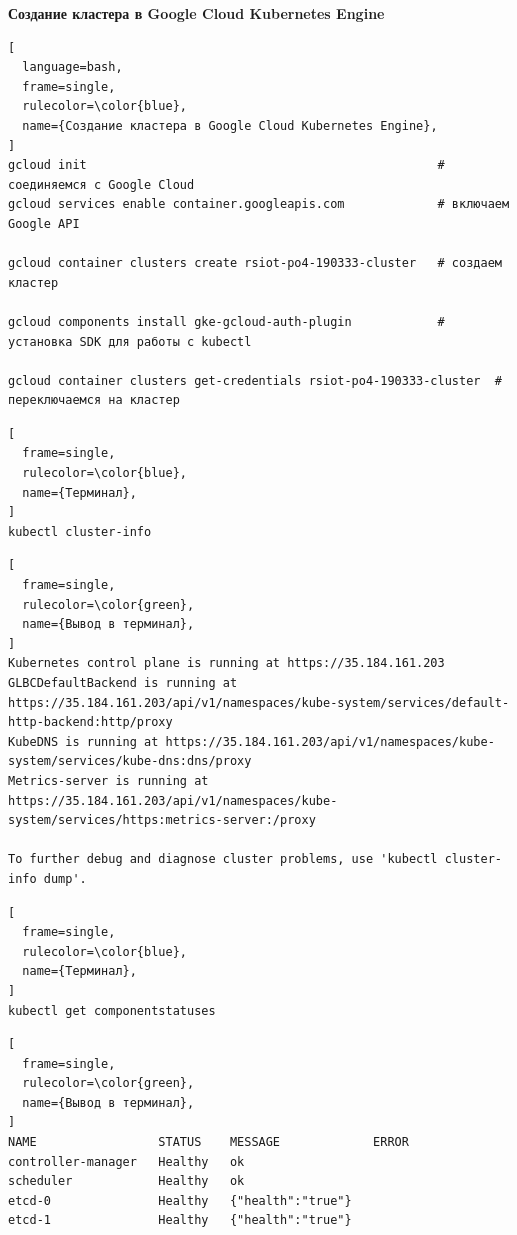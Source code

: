 \documentclass[12pt, a4paper, simple]{eskdtext}
\begin{document}
\begin{center}
  \textbf{Создание кластера в Google Cloud Kubernetes Engine}
\end{center}

\begin{lstlisting}[
  language=bash,
  frame=single,
  rulecolor=\color{blue},
  name={Создание кластера в Google Cloud Kubernetes Engine},
]
gcloud init                                                 # соединяемся с Google Cloud
gcloud services enable container.googleapis.com             # включаем Google API

gcloud container clusters create rsiot-po4-190333-cluster   # создаем кластер

gcloud components install gke-gcloud-auth-plugin            # установка SDK для работы с kubectl

gcloud container clusters get-credentials rsiot-po4-190333-cluster  # переключаемся на кластер  
\end{lstlisting}

\begin{lstlisting}[
  frame=single,
  rulecolor=\color{blue},
  name={Терминал},
]
kubectl cluster-info
\end{lstlisting}

\begin{lstlisting}[
  frame=single,
  rulecolor=\color{green},
  name={Вывод в терминал},
]
Kubernetes control plane is running at https://35.184.161.203
GLBCDefaultBackend is running at https://35.184.161.203/api/v1/namespaces/kube-system/services/default-http-backend:http/proxy
KubeDNS is running at https://35.184.161.203/api/v1/namespaces/kube-system/services/kube-dns:dns/proxy
Metrics-server is running at https://35.184.161.203/api/v1/namespaces/kube-system/services/https:metrics-server:/proxy

To further debug and diagnose cluster problems, use 'kubectl cluster-info dump'.   
\end{lstlisting}

\begin{lstlisting}[
  frame=single,
  rulecolor=\color{blue},
  name={Терминал},
]
kubectl get componentstatuses 
\end{lstlisting}

\begin{lstlisting}[
  frame=single,
  rulecolor=\color{green},
  name={Вывод в терминал},
]
NAME                 STATUS    MESSAGE             ERROR
controller-manager   Healthy   ok                  
scheduler            Healthy   ok                  
etcd-0               Healthy   {"health":"true"}   
etcd-1               Healthy   {"health":"true"}  
\end{lstlisting}
\end{document}
